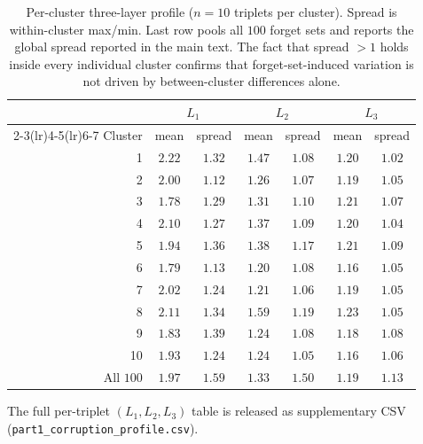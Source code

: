 \documentclass[11pt]{article}
\newcommand{\Lone}{L_1}
\newcommand{\Ltwo}{L_2}
\newcommand{\Lthree}{L_3}
\begin{document}
\begin{table}[h]
\centering
\small
\setlength{\tabcolsep}{3.5pt}
\begin{tabular}{@{}rcccccc@{}}
    \toprule
    & \multicolumn{2}{c}{$\Lone$} & \multicolumn{2}{c}{$\Ltwo$} & \multicolumn{2}{c}{$\Lthree$} \\
    \cmidrule(lr){2-3}\cmidrule(lr){4-5}\cmidrule(lr){6-7}
    Cluster & mean & spread & mean & spread & mean & spread \\
    \midrule
     1 & $2.22$ & $1.32$ & $1.47$ & $1.08$ & $1.20$ & $1.02$ \\
     2 & $2.00$ & $1.12$ & $1.26$ & $1.07$ & $1.19$ & $1.05$ \\
     3 & $1.78$ & $1.29$ & $1.31$ & $1.10$ & $1.21$ & $1.07$ \\
     4 & $2.10$ & $1.27$ & $1.37$ & $1.09$ & $1.20$ & $1.04$ \\
     5 & $1.94$ & $1.36$ & $1.38$ & $1.17$ & $1.21$ & $1.09$ \\
     6 & $1.79$ & $1.13$ & $1.20$ & $1.08$ & $1.16$ & $1.05$ \\
     7 & $2.02$ & $1.24$ & $1.21$ & $1.06$ & $1.19$ & $1.05$ \\
     8 & $2.11$ & $1.34$ & $1.59$ & $1.19$ & $1.23$ & $1.05$ \\
     9 & $1.83$ & $1.39$ & $1.24$ & $1.08$ & $1.18$ & $1.08$ \\
    10 & $1.93$ & $1.24$ & $1.24$ & $1.05$ & $1.16$ & $1.06$ \\
    \midrule
    All $100$ & $1.97$ & $\mathbf{1.59}$ & $1.33$ & $\mathbf{1.50}$ & $1.19$ & $\mathbf{1.13}$ \\
    \bottomrule
\end{tabular}
\caption{Per-cluster three-layer profile ($n{=}10$ triplets per cluster). Spread is within-cluster max/min. Last row pools all $100$ forget sets and reports the global spread reported in the main text. The fact that spread $>1$ holds inside every individual cluster confirms that forget-set-induced variation is not driven by between-cluster differences alone.}
\label{tab:per-cluster}
\end{table}

The full per-triplet $(\Lone,\Ltwo,\Lthree)$ table is released as supplementary CSV (\texttt{part1\_corruption\_profile.csv}).
\end{document}

